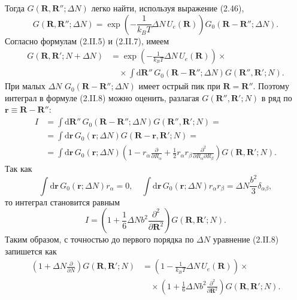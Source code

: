 \documentclass[12pt,a4paper]{article}
\begin{document}
Тогда $G(\boldsymbol{R}, \boldsymbol{R}''; \Delta N)$ легко найти, используя выражение (2.46),
\begin{equation}
G(\boldsymbol{R}, \boldsymbol{R}''; \Delta N) = \exp\left(-\frac{1}{k_B T}\Delta N\,U_e(\boldsymbol{R})\right)G_0(\boldsymbol{R} - \boldsymbol{R}''; \Delta N). \tag{2.II.7}
\end{equation}
Согласно формулам (2.II.5) и (2.II.7), имеем
\begin{align}
G(\boldsymbol{R}, \boldsymbol{R}'; N + \Delta N) &= \exp\left(-\frac{1}{k_B T}\Delta N\,U_e(\boldsymbol{R})\right)\times \nonumber\\
&\quad \times \int\!\mathrm{d}\boldsymbol{R}''\,G_0(\boldsymbol{R} - \boldsymbol{R}''; \Delta N)G(\boldsymbol{R}'', \boldsymbol{R}'; N). \tag{2.II.8}
\end{align}
При малых $\Delta N$ $G_0(\boldsymbol{R} - \boldsymbol{R}''; \Delta N)$ имеет острый пик при $\boldsymbol{R} = \boldsymbol{R}''$. Поэтому интеграл в формуле (2.II.8) можно оценить, разлагая $G(\boldsymbol{R}'', \boldsymbol{R}'; N)$ в ряд по $\boldsymbol{r} \equiv \boldsymbol{R} - \boldsymbol{R}''$:
\begin{align}
I &= \int\!\mathrm{d}\boldsymbol{R}''\,G_0(\boldsymbol{R} - \boldsymbol{R}''; \Delta N)G(\boldsymbol{R}'', \boldsymbol{R}'; N) = \nonumber\\
&= \int\!\mathrm{d}\boldsymbol{r}\,G_0(\boldsymbol{r}; \Delta N)G(\boldsymbol{R} - \boldsymbol{r}, \boldsymbol{R}'; N) = \nonumber\\
&= \int\!\mathrm{d}\boldsymbol{r}\,G_0(\boldsymbol{r}; \Delta N)\left(1 - r_\alpha\frac{\partial}{\partial R_\alpha} + \frac{1}{2}r_\alpha r_\beta \frac{\partial^2}{\partial R_\alpha \partial R_\beta}\right)G(\boldsymbol{R}, \boldsymbol{R}'; N). \tag{2.II.9}
\end{align}
Так как
\begin{equation}
\int\!\mathrm{d}\boldsymbol{r}\,G_0(\boldsymbol{r}; \Delta N)r_\alpha = 0, \quad \int\!\mathrm{d}\boldsymbol{r}\,G_0(\boldsymbol{r}; \Delta N)r_\alpha r_\beta = \Delta N\frac{b^2}{3}\delta_{\alpha\beta}, \tag{2.II.10}
\end{equation}
то интеграл становится равным
\begin{equation}
I = \left(1 + \frac{1}{6}\Delta Nb^2 \frac{\partial^2}{\partial\boldsymbol{R}^2}\right)G(\boldsymbol{R}, \boldsymbol{R}'; N). \tag{2.II.11}
\end{equation}
Таким образом, с точностью до первого порядка по $\Delta N$ уравнение (2.II.8) запишется как
\begin{align}
\left(1 + \Delta N\frac{\partial}{\partial N}\right)G(\boldsymbol{R}, \boldsymbol{R}'; N) &= \left(1 - \frac{1}{k_B T}\Delta N\,U_e(\boldsymbol{R})\right)\times \nonumber\\
&\quad \times \left(1 + \frac{1}{6}\Delta Nb^2\frac{\partial^2}{\partial\boldsymbol{R}^2}\right)G(\boldsymbol{R}, \boldsymbol{R}'; N). \tag{2.II.12}
\end{align}
\end{document}
